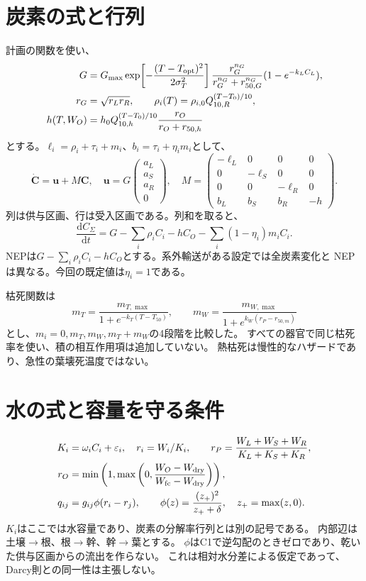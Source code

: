 \documentclass[a4paper,11pt]{ltjsarticle}
\newcommand{\dd}{\mathrm d}
\begin{document}
\section{炭素の式と行列}
計画の関数を使い、
\begin{align}
G&=G_{\max}\exp\!\left[-\frac{(T-T_{\rm opt})^2}{2\sigma_T^2}\right]
\frac{r_G^{n_G}}{r_G^{n_G}+r_{50,G}^{n_G}}
(1-e^{-k_LC_L}),\\
r_G&=\sqrt{r_Lr_R},\qquad
\rho_i(T)=\rho_{i,0}Q_{10,R}^{(T-T_0)/10},\\
h(T,W_O)&=h_0Q_{10,h}^{(T-T_0)/10}\frac{r_O}{r_O+r_{50,h}}
\end{align}
とする。$\ell_i=\rho_i+\tau_i+m_i$、$b_i=\tau_i+\eta_i m_i$として、
\begin{equation}
\dot{\bm C}=\bm u+M\bm C,\quad
\bm u=G\begin{pmatrix}a_L\\a_S\\a_R\\0\end{pmatrix},\quad
M=\begin{pmatrix}
-\ell_L&0&0&0\\0&-\ell_S&0&0\\0&0&-\ell_R&0\\
b_L&b_S&b_R&-h
\end{pmatrix}.
\end{equation}
列は供与区画、行は受入区画である。列和を取ると、
\begin{equation}
\frac{\dd C_\Sigma}{\dd t}
=G-\sum_i\rho_iC_i-hC_O-\sum_i(1-\eta_i)m_iC_i.
\end{equation}
NEPは$G-\sum_i\rho_iC_i-hC_O$とする。系外輸送がある設定では全炭素変化と
NEPは異なる。今回の既定値は$\eta_i=1$である。

枯死関数は
\begin{equation}
m_T=\frac{m_{T,\max}}{1+e^{-k_T(T-T_{50})}},\qquad
m_W=\frac{m_{W,\max}}{1+e^{k_W(r_P-r_{50,m})}}
\end{equation}
とし、$m_i=0,m_T,m_W,m_T+m_W$の4段階を比較した。
すべての器官で同じ枯死率を使い、積の相互作用項は追加していない。
熱枯死は慢性的なハザードであり、急性の葉壊死温度ではない。

\section{水の式と容量を守る条件}
\begin{align}
K_i&=\omega_iC_i+\varepsilon_i,\quad r_i=W_i/K_i,\qquad
r_P=\frac{W_L+W_S+W_R}{K_L+K_S+K_R},\\
r_O&=\min\left(1,\max\left(0,\frac{W_O-W_{\rm dry}}{W_{\rm fc}-W_{\rm dry}}\right)\right),\\
q_{ij}&=g_{ij}\phi(r_i-r_j),\qquad
\phi(z)=\frac{(z_+)^2}{z_++\delta},\quad z_+=\max(z,0).
\end{align}
$K_i$はここでは水容量であり、炭素の分解率行列とは別の記号である。
内部辺は土壌$\to$根、根$\to$幹、幹$\to$葉とする。
$\phi$はC1で逆勾配のときゼロであり、乾いた供与区画からの流出を作らない。
これは相対水分差による仮定であって、Darcy則との同一性は主張しない。
\end{document}
